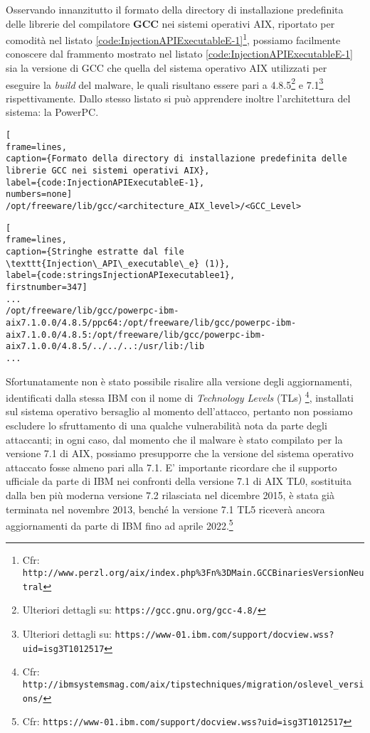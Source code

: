 \documentclass[10pt,a4paper, titlepage]{report}
\begin{document}
Osservando innanzitutto il formato della directory di installazione predefinita delle librerie del compilatore \textbf{GCC} nei sistemi operativi AIX, riportato per comodità nel listato \ref{code:InjectionAPIExecutableE-1}\footnote{Cfr: \texttt{http://www.perzl.org/aix/index.php\%3Fn\%3DMain.GCCBinariesVersionNeutral}}, possiamo facilmente conoscere dal frammento mostrato nel listato \ref{code:InjectionAPIExecutableE-1} sia la versione di GCC che quella del sistema operativo AIX utilizzati per eseguire la \textit{build} del malware, le quali risultano essere pari a 4.8.5\footnote{Ulteriori dettagli su: \texttt{https://gcc.gnu.org/gcc-4.8/}} e 7.1\footnote{Ulteriori dettagli su: \texttt{https://www-01.ibm.com/support/docview.wss?uid=isg3T1012517}} rispettivamente. Dallo stesso listato si può apprendere inoltre l'architettura del sistema: la PowerPC\texttrademark.

\begin{lstlisting}[
frame=lines, 
caption={Formato della directory di installazione predefinita delle librerie GCC nei sistemi operativi AIX}, 
label={code:InjectionAPIExecutableE-1},
numbers=none]
/opt/freeware/lib/gcc/<architecture_AIX_level>/<GCC_Level>
\end{lstlisting}

\begin{lstlisting}[
frame=lines, 
caption={Stringhe estratte dal file \texttt{Injection\_API\_executable\_e} (1)}, 
label={code:stringsInjectionAPIexecutablee1},
firstnumber=347]
...
/opt/freeware/lib/gcc/powerpc-ibm-aix7.1.0.0/4.8.5/ppc64:/opt/freeware/lib/gcc/powerpc-ibm-aix7.1.0.0/4.8.5:/opt/freeware/lib/gcc/powerpc-ibm-aix7.1.0.0/4.8.5/../../..:/usr/lib:/lib
...
\end{lstlisting}

Sfortunatamente non è stato possibile risalire alla versione degli aggiornamenti, identificati dalla stessa IBM con il nome di \textit{Technology Levels} (TLs) \footnote{Cfr: \texttt{http://ibmsystemsmag.com/aix/tipstechniques/migration/oslevel\_versions/}}, installati sul sistema operativo bersaglio al momento dell'attacco, pertanto non possiamo escludere lo sfruttamento di una qualche vulnerabilità nota da parte degli attaccanti; in ogni caso, dal momento che il malware è stato compilato per la versione 7.1 di AIX, possiamo presupporre che la versione del sistema operativo attaccato fosse almeno pari alla 7.1. E' importante ricordare che   il supporto ufficiale da parte di IBM nei confronti della versione 7.1 di AIX TL0, sostituita dalla ben più moderna versione 7.2 rilasciata nel dicembre 2015, è stata già terminata nel novembre 2013, benché la versione 7.1 TL5 riceverà ancora aggiornamenti da parte di IBM fino ad aprile 2022.\footnote{Cfr: \texttt{https://www-01.ibm.com/support/docview.wss?uid=isg3T1012517}}
\end{document}
